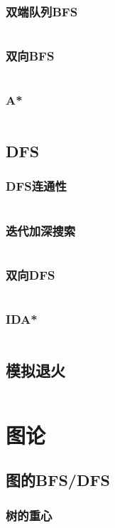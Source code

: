 \documentclass[a4paper,12pt]{article}
\begin{document}
\subsubsection{双端队列BFS}
\inputminted[breaklines, linenos]{c++}{search/bfs/deq_bfs.cc}
\subsubsection{双向BFS}
\inputminted[breaklines, linenos]{c++}{search/bfs/2side_bfs.cc}
\subsubsection{A*}
\inputminted[breaklines, linenos]{c++}{search/bfs/astar.cc}
\subsection{DFS}
\subsubsection{DFS连通性}
\inputminted[breaklines, linenos]{c++}{search/dfs/link.cc}
\subsubsection{迭代加深搜索}
\inputminted[breaklines, linenos]{c++}{search/dfs/diedai.cc}
\subsubsection{双向DFS}
\inputminted[breaklines, linenos]{c++}{search/dfs/2side.cc}
\subsubsection{IDA*}
\inputminted[breaklines, linenos]{c++}{search/dfs/ida.cc}
\subsection{模拟退火}
\inputminted[breaklines, linenos]{c++}{search/simulate_anneal.cc}


\newpage
\section{图论} %
\subsection{图的BFS/DFS}  %
\subsubsection{树的重心}
\inputminted[breaklines, linenos]{c++}{graph/bdfs/grav.cc}
\end{document}
